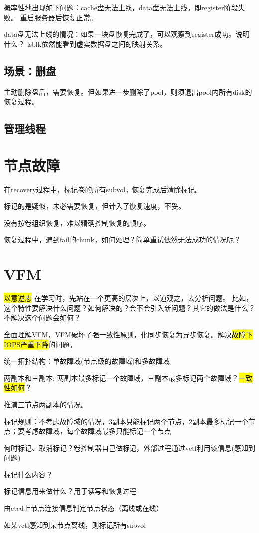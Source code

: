 概率性地出现如下问题：cache盘无法上线，data盘无法上线。即register阶段失败。
重启服务器后恢复正常。

data盘无法上线的情况：如果一块盘恢复完成了，可以观察到register成功。说明什么？
lsblk依然能看到虚实数据盘之间的映射关系。

\subsection{场景：删盘}

主动删除盘后，需要恢复。但如果进一步删除了pool，则须退出pool内所有disk的恢复过程。

\subsection{管理线程}

\section{节点故障}

在recovery过程中，标记卷的所有subvol，恢复完成后清除标记。

标记的是疑似，未必需要恢复，但计入了恢复速度，不妥。

没有按卷组织恢复，难以精确控制恢复的顺序。

恢复过程中，遇到fail的chunk，如何处理？简单重试依然无法成功的情况呢？

\section{VFM}

\hl{以意逆志} 在学习时，先站在一个更高的层次上，以道观之，去分析问题。
比如，这个特性要解决什么问题？如何解决的？会不会引入新问题？其它的做法是什么？
不解决这个问题会如何？

全面理解VFM，VFM破坏了强一致性原则，化同步恢复为异步恢复。解决\hl{故障下IOPS严重下降}的问题。

统一拓扑结构：单故障域(节点级的故障域)和多故障域

两副本和三副本: 两副本最多标记一个故障域，三副本最多标记两个故障域？\hl{一致性如何}？

推演三节点两副本的情况。

\begin{enumbox}
\item 标记规则：不考虑故障域的情况，3副本只能标记两个节点，2副本最多标记一个节点；要考虑故障域，每个故障域最多只能标记一个节点
\item 何时标记、取消标记？卷控制器自己做标记，外部过程通过vctl利用该信息(感知到问题)
\item 标记什么内容？
\item 标记信息用来做什么？用于读写和恢复过程
\item *
\item 由etcd上节点连接信息判定节点状态（离线或在线）
\item 如某vctl感知到某节点离线，则标记所有subvol
\end{enumbox}


